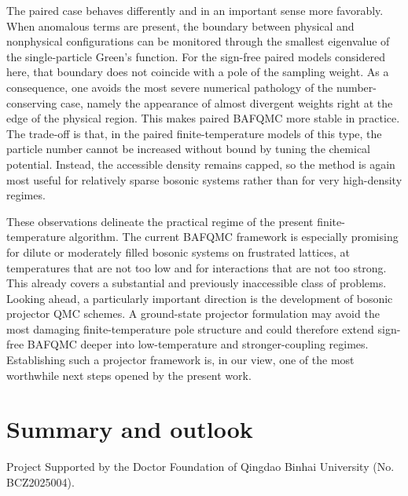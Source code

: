 \documentclass[twocolumn,aps,prb,10pt,amsmath,amssymb,amsthm,superscriptaddress]{revtex4-2}
\theoremstyle{remark}
\begin{document}
The paired case behaves differently and in an important sense more favorably. When anomalous terms are present, the boundary between physical and nonphysical configurations can be monitored through the smallest eigenvalue of the single-particle Green's function. For the sign-free paired models considered here, that boundary does not coincide with a pole of the sampling weight. As a consequence, one avoids the most severe numerical pathology of the number-conserving case, namely the appearance of almost divergent weights right at the edge of the physical region. This makes paired BAFQMC more stable in practice. The trade-off is that, in the paired finite-temperature models of this type, the particle number cannot be increased without bound by tuning the chemical potential. Instead, the accessible density remains capped, so the method is again most useful for relatively sparse bosonic systems rather than for very high-density regimes.

These observations delineate the practical regime of the present finite-temperature algorithm. The current BAFQMC framework is especially promising for dilute or moderately filled bosonic systems on frustrated lattices, at temperatures that are not too low and for interactions that are not too strong. This already covers a substantial and previously inaccessible class of problems. Looking ahead, a particularly important direction is the development of bosonic projector QMC schemes. A ground-state projector formulation may avoid the most damaging finite-temperature pole structure and could therefore extend sign-free BAFQMC deeper into low-temperature and stronger-coupling regimes. Establishing such a projector framework is, in our view, one of the most worthwhile next steps opened by the present work.

\section{Summary and outlook}
\label{sec:summary}







\begin{acknowledgments}
Project Supported by the Doctor Foundation of Qingdao Binhai University (No. BCZ2025004).
\end{acknowledgments}



\end{document}
